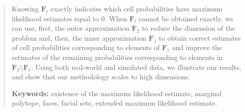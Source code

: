 \documentclass[aos,noinfoline]{imsart}
\newcommand{\Fbf}{\mathbf{F}}
\theoremstyle{remark}
\theoremstyle{definition}
\newcommand{\jo}[1]{\textcolor{green}{{J: #1}}}
\begin{document}
\begin{frontmatter}
\begin{abstract}
  Knowing $\Fbf_t$ exactly indicates which cell probabilities have maximum likelihood estimates equal to $0$.
   When  $\Fbf_t$ cannot be obtained exactly, we can use, first, the outer approximation $\Fbf_2$ to  reduce the dimension of the problem and, then, the inner approximation $\Fbf_1$ to obtain correct estimates of cell probabilities corresponding to elements of $\Fbf_1$ and improve the estimates of the remaining probabilities corresponding to elements in $\Fbf_2\setminus \Fbf_1$.
Using both real-world and simulated data, we illustrate our results, and show  that our methodology scales to high dimensions. 

\vspace{.5cm}

\noindent
\textbf{Keywords:} existence of the maximum likelihood estimate, marginal polytope, faces, facial sets, extended maximum likelihood estimate.
\vspace{.5cm}
 
 \end{abstract}



\end{frontmatter}


\end{document}
